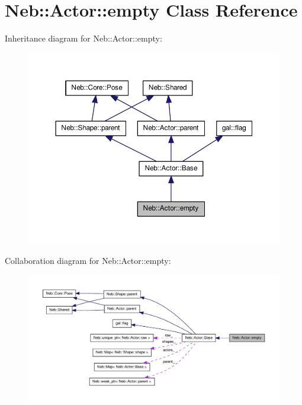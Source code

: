 \hypertarget{classNeb_1_1Actor_1_1empty}{\section{\-Neb\-:\-:\-Actor\-:\-:empty \-Class \-Reference}
\label{classNeb_1_1Actor_1_1empty}
}


\-Inheritance diagram for \-Neb\-:\-:\-Actor\-:\-:empty\-:
\nopagebreak
\begin{figure}[H]
\begin{center}
\leavevmode
\includegraphics[width=350pt]{classNeb_1_1Actor_1_1empty__inherit__graph}
\end{center}
\end{figure}


\-Collaboration diagram for \-Neb\-:\-:\-Actor\-:\-:empty\-:
\nopagebreak
\begin{figure}[H]
\begin{center}
\leavevmode
\includegraphics[width=350pt]{classNeb_1_1Actor_1_1empty__coll__graph}
\end{center}
\end{figure}
